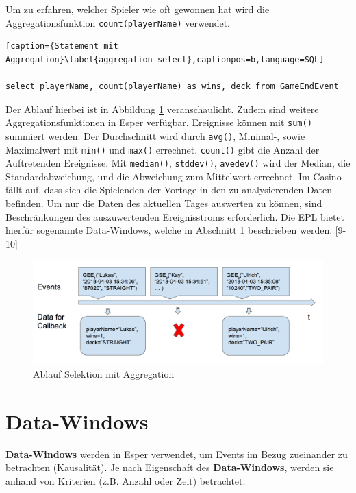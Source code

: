 Um zu erfahren, welcher Spieler wie oft gewonnen hat wird die Aggregationsfunktion \texttt{count(playerName)} verwendet.
\begin{lstlisting}[caption={Statement mit Aggregation}\label{aggregation_select},captionpos=b,language=SQL]

select playerName, count(playerName) as wins, deck from GameEndEvent

\end{lstlisting}
Der Ablauf hierbei ist in Abbildung \ref{aggregation_select_img} veranschaulicht. 
Zudem sind weitere Aggregationsfunktionen in Esper verfügbar.
Ereignisse können mit \texttt{sum()} summiert werden. Der Durchschnitt wird durch \texttt{avg()}, Minimal-, sowie Maximalwert mit \texttt{min()} und \texttt{max()} errechnet. \texttt{count()} gibt die Anzahl der Auftretenden Ereignisse. Mit \texttt{median()}, \texttt{stddev()}, \texttt{avedev()} wird der Median, die Standardabweichung, und die Abweichung zum Mittelwert errechnet.
Im Casino fällt auf, dass sich die Spielenden der Vortage in den zu analysierenden Daten befinden. Um nur die Daten des aktuellen Tages auswerten zu können, sind Beschränkungen des auszuwertenden Ereignisstroms erforderlich. Die \acf{EPL} bietet hierfür sogenannte Data-Windows, welche in Abschnitt \ref{Data-Windows} beschrieben werden.
\cite{EsperRef2018}[9-10]

\begin{figure}[ht]
	\centering
	\includegraphics[width=\textwidth,height=\textheight, keepaspectratio]{images/statement_basic_aggregation.png}
	\caption{Ablauf Selektion mit Aggregation}
	\label{aggregation_select_img}
\end{figure}

\section{Data-Windows}
\label{Data-Windows}

\textbf{Data-Windows} werden in Esper verwendet, um Events im Bezug zueinander zu betrachten (Kausalität). Je nach Eigenschaft des \textbf{Data-Windows}, werden sie anhand von Kriterien (z.B. Anzahl oder Zeit) betrachtet.


